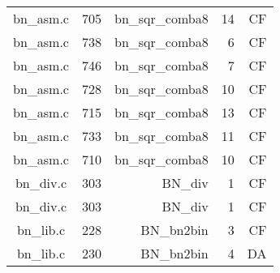 \begin{table}
\begin{tabular}{clrrr}
bn\_asm.c& 705&bn\_sqr\_comba8&14&CF\\
bn\_asm.c& 738&bn\_sqr\_comba8&6 &CF\\
bn\_asm.c& 746&bn\_sqr\_comba8&7 &CF\\
bn\_asm.c& 728&bn\_sqr\_comba8&10&CF\\
bn\_asm.c& 715&bn\_sqr\_comba8&13&CF\\
bn\_asm.c& 733&bn\_sqr\_comba8&11&CF\\
bn\_asm.c& 710&bn\_sqr\_comba8&10&CF\\
bn\_div.c& 303&BN\_div&1 &CF\\
bn\_div.c& 303&BN\_div&1 &CF\\
bn\_lib.c& 228&BN\_bn2bin&3 &CF\\
bn\_lib.c& 230&BN\_bn2bin&4 &DA\\
\hline
\end{tabular}
\end{table}

